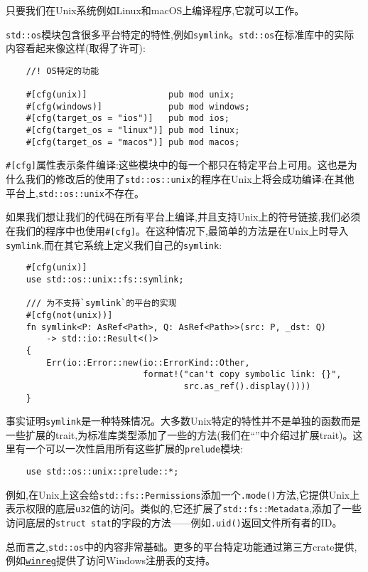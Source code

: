 只要我们在Unix系统例如Linux和macOS上编译程序,它就可以工作。

\texttt{std::os}模块包含很多平台特定的特性,例如\texttt{symlink}。\texttt{std::os}在标准库中的实际内容看起来像这样(取得了许可):
\begin{verbatim}
    //! OS特定的功能

    #[cfg(unix)]                pub mod unix;
    #[cfg(windows)]             pub mod windows;
    #[cfg(target_os = "ios")]   pub mod ios;
    #[cfg(target_os = "linux")] pub mod linux;
    #[cfg(target_os = "macos")] pub mod macos;
\end{verbatim}

\texttt{\#[cfg]}属性表示条件编译:这些模块中的每一个都只在特定平台上可用。这也是为什么我们的修改后的使用了\texttt{std::os::unix}的程序在Unix上将会成功编译:在其他平台上,\texttt{std::os::unix}不存在。

如果我们想让我们的代码在所有平台上编译,并且支持Unix上的符号链接,我们必须在我们的程序中也使用\texttt{\#[cfg]}。在这种情况下,最简单的方法是在Unix上时导入\texttt{symlink},而在其它系统上定义我们自己的\texttt{symlink}:
\begin{verbatim}
    #[cfg(unix)]
    use std::os::unix::fs::symlink;

    /// 为不支持`symlink`的平台的实现
    #[cfg(not(unix))]
    fn symlink<P: AsRef<Path>, Q: AsRef<Path>>(src: P, _dst: Q)
        -> std::io::Result<()>
    {
        Err(io::Error::new(io::ErrorKind::Other,
                           format!("can't copy symbolic link: {}", 
                                   src.as_ref().display())))
    }
\end{verbatim}

事实证明\texttt{symlink}是一种特殊情况。大多数Unix特定的特性并不是单独的函数而是一些扩展的trait,为标准库类型添加了一些的方法(我们在“”中介绍过扩展trait)。这里有一个可以一次性启用所有这些扩展的\texttt{prelude}模块:
\begin{verbatim}
    use std::os::unix::prelude::*;
\end{verbatim}

例如,在Unix上这会给\texttt{std::fs::Permissions}添加一个\texttt{.mode()}方法,它提供Unix上表示权限的底层\texttt{u32}值的访问。类似的,它还扩展了\texttt{std::fs::Metadata},添加了一些访问底层的\texttt{struct stat}的字段的方法——例如\texttt{.uid()}返回文件所有者的ID。

总而言之,\texttt{std::os}中的内容非常基础。更多的平台特定功能通过第三方crate提供,例如\href{https://crates.io/crates/winreg}{\texttt{winreg}}提供了访问Windows注册表的支持。

